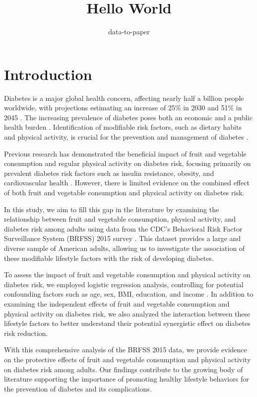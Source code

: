 \documentclass[12pt]{article}
\title{Hello World}
\author{data-to-paper}
\begin{document}
\maketitle

\section{Introduction}

Diabetes is a major global health concern, affecting nearly half a billion people worldwide, with projections estimating an increase of 25\% in 2030 and 51\% in 2045 \cite{Saeedi2019GlobalAR}. The increasing prevalence of diabetes poses both an economic and a public health burden \cite{Wild2004GlobalPO}. Identification of modifiable risk factors, such as dietary habits and physical activity, is crucial for the prevention and management of diabetes \cite{Uloko2018PrevalenceAR}.

Previous research has demonstrated the beneficial impact of fruit and vegetable consumption and regular physical activity on diabetes risk, focusing primarily on prevalent diabetes risk factors such as insulin resistance, obesity, and cardiovascular health \cite{Bohn2015ImpactOP, Herbst2015ImpactOR}. However, there is limited evidence on the combined effect of both fruit and vegetable consumption and physical activity on diabetes risk.

In this study, we aim to fill this gap in the literature by examining the relationship between fruit and vegetable consumption, physical activity, and diabetes risk among adults using data from the CDC's Behavioral Risk Factor Surveillance System (BRFSS) 2015 survey \cite{Flores-Hernndez2015QualityOD}. This dataset provides a large and diverse sample of American adults, allowing us to investigate the association of these modifiable lifestyle factors with the risk of developing diabetes.

To assess the impact of fruit and vegetable consumption and physical activity on diabetes risk, we employed logistic regression analysis, controlling for potential confounding factors such as age, sex, BMI, education, and income \cite{Joshi2021PredictingT2}. In addition to examining the independent effects of fruit and vegetable consumption and physical activity on diabetes risk, we also analyzed the interaction between these lifestyle factors to better understand their potential synergistic effect on diabetes risk reduction.

With this comprehensive analysis of the BRFSS 2015 data, we provide evidence on the protective effects of fruit and vegetable consumption and physical activity on diabetes risk among adults. Our findings contribute to the growing body of literature supporting the importance of promoting healthy lifestyle behaviors for the prevention of diabetes and its complications.
\end{document}
